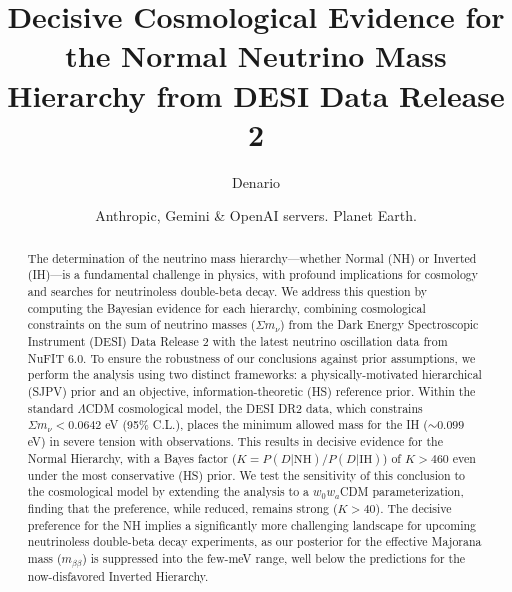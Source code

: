 \documentclass[]{article}
\begin{document}
\title{Decisive Cosmological Evidence for the Normal Neutrino Mass Hierarchy from DESI Data Release 2}

\author{Denario}
\date{Anthropic, Gemini \& OpenAI servers. Planet Earth.}

\maketitle
\begin{abstract}
The determination of the neutrino mass hierarchy—whether Normal (NH) or Inverted (IH)—is a fundamental challenge in physics, with profound implications for cosmology and searches for neutrinoless double-beta decay. We address this question by computing the Bayesian evidence for each hierarchy, combining cosmological constraints on the sum of neutrino masses ($\Sigma m_\nu$) from the Dark Energy Spectroscopic Instrument (DESI) Data Release 2 with the latest neutrino oscillation data from NuFIT 6.0. To ensure the robustness of our conclusions against prior assumptions, we perform the analysis using two distinct frameworks: a physically-motivated hierarchical (SJPV) prior and an objective, information-theoretic (HS) reference prior. Within the standard $\Lambda$CDM cosmological model, the DESI DR2 data, which constrains $\Sigma m_\nu < 0.0642$ eV (95\% C.L.), places the minimum allowed mass for the IH ($\sim 0.099$ eV) in severe tension with observations. This results in decisive evidence for the Normal Hierarchy, with a Bayes factor ($K = P(D|\text{NH}) / P(D|\text{IH})$) of $K > 460$ even under the most conservative (HS) prior. We test the sensitivity of this conclusion to the cosmological model by extending the analysis to a $w_0w_a$CDM parameterization, finding that the preference, while reduced, remains strong ($K > 40$). The decisive preference for the NH implies a significantly more challenging landscape for upcoming neutrinoless double-beta decay experiments, as our posterior for the effective Majorana mass ($m_{\beta\beta}$) is suppressed into the few-meV range, well below the predictions for the now-disfavored Inverted Hierarchy.
\end{abstract}
\end{document}
